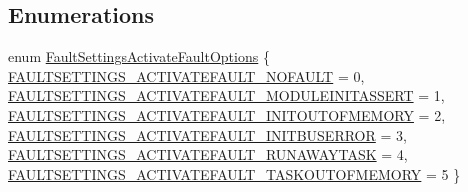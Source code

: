 \subsection*{\-Enumerations}
\begin{DoxyCompactItemize}
\item 
enum \hyperlink{group___fault_settings_gacb3328778e7c437bf65645e5f6483115}{\-Fault\-Settings\-Activate\-Fault\-Options} \{ \*
\hyperlink{group___fault_settings_ggacb3328778e7c437bf65645e5f6483115a241fcfa8c727186b100be542c8d1fbe3}{\-F\-A\-U\-L\-T\-S\-E\-T\-T\-I\-N\-G\-S\-\_\-\-A\-C\-T\-I\-V\-A\-T\-E\-F\-A\-U\-L\-T\-\_\-\-N\-O\-F\-A\-U\-L\-T} = 0, 
\hyperlink{group___fault_settings_ggacb3328778e7c437bf65645e5f6483115a754f873662dc5fac22a6d0f713a260f4}{\-F\-A\-U\-L\-T\-S\-E\-T\-T\-I\-N\-G\-S\-\_\-\-A\-C\-T\-I\-V\-A\-T\-E\-F\-A\-U\-L\-T\-\_\-\-M\-O\-D\-U\-L\-E\-I\-N\-I\-T\-A\-S\-S\-E\-R\-T} = 1, 
\hyperlink{group___fault_settings_ggacb3328778e7c437bf65645e5f6483115ac7718876c9a8eb60f4160efcbfe2aebf}{\-F\-A\-U\-L\-T\-S\-E\-T\-T\-I\-N\-G\-S\-\_\-\-A\-C\-T\-I\-V\-A\-T\-E\-F\-A\-U\-L\-T\-\_\-\-I\-N\-I\-T\-O\-U\-T\-O\-F\-M\-E\-M\-O\-R\-Y} = 2, 
\hyperlink{group___fault_settings_ggacb3328778e7c437bf65645e5f6483115af3907054848d7e86d9b0f3946d40888f}{\-F\-A\-U\-L\-T\-S\-E\-T\-T\-I\-N\-G\-S\-\_\-\-A\-C\-T\-I\-V\-A\-T\-E\-F\-A\-U\-L\-T\-\_\-\-I\-N\-I\-T\-B\-U\-S\-E\-R\-R\-O\-R} = 3, 
\*
\hyperlink{group___fault_settings_ggacb3328778e7c437bf65645e5f6483115a0a47bf7e10e8159d586185e742e648b5}{\-F\-A\-U\-L\-T\-S\-E\-T\-T\-I\-N\-G\-S\-\_\-\-A\-C\-T\-I\-V\-A\-T\-E\-F\-A\-U\-L\-T\-\_\-\-R\-U\-N\-A\-W\-A\-Y\-T\-A\-S\-K} = 4, 
\hyperlink{group___fault_settings_ggacb3328778e7c437bf65645e5f6483115a82d2701a4b41f07204c080aec925aecd}{\-F\-A\-U\-L\-T\-S\-E\-T\-T\-I\-N\-G\-S\-\_\-\-A\-C\-T\-I\-V\-A\-T\-E\-F\-A\-U\-L\-T\-\_\-\-T\-A\-S\-K\-O\-U\-T\-O\-F\-M\-E\-M\-O\-R\-Y} = 5
 \}
\end{DoxyCompactItemize}
